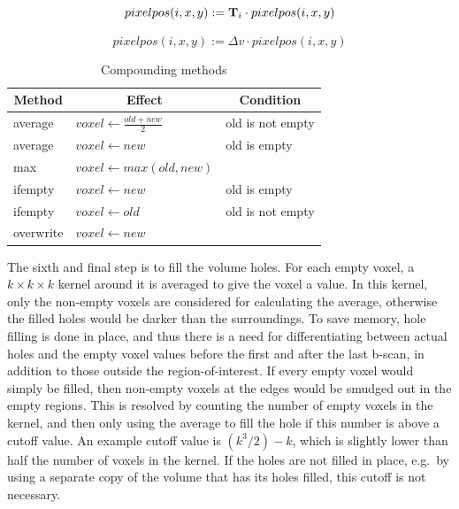	\begin{equation}
	\label{eq:transform_pixel_pos}
		pixelpos(i,x,y) := \textbf{T}_i \cdot pixelpos(i,x,y)
	\end{equation}
	
	\begin{equation}
	\label{eq:round_off}
		pixelpos(i,x,y) := \Delta v \cdot pixelpos(i,x,y)
	\end{equation}
	
	\begin{table}[h]
	\centering
	\begin{tabular}{| l l l |}
		\hline
		\multicolumn{1}{|c}{\textbf{Method}} & \multicolumn{1}{c}{\textbf{Effect}} & \multicolumn{1}{c|}{\textbf{Condition}} \\
		\hline
		\hline
		average 			& $voxel \leftarrow \frac{old+new}{2}$ 	& old is not empty \\
		average 			& $voxel \leftarrow new$ 				& old is empty \\
		max 				& $voxel \leftarrow max(old, new)$ 		& \\
		ifempty 			& $voxel \leftarrow new$ 				& old is empty \\
		ifempty 			& $voxel \leftarrow old$ 				& old is not empty \\
		overwrite 			& $voxel \leftarrow new$ 				& \\
		\hline
	\end{tabular}
	\caption{Compounding methods}
	\label{table:compounding_methods}
	\end{table}
	
	The sixth and final step is to fill the volume holes. For each empty voxel, a $k \times k \times k$ kernel around it is averaged to give the voxel a value. In this kernel, only the non-empty voxels are considered for calculating the average, otherwise the filled holes would be darker than the surroundings. To save memory, hole filling is done in place, and thus there is a need for differentiating between actual holes and the empty voxel values before the first and after the last b-scan, in addition to those outside the region-of-interest. If every empty voxel would simply be filled, then non-empty voxels at the edges would be smudged out in the empty regions. This is resolved by counting the number of empty voxels in the kernel, and then only using the average to fill the hole if this number is above a cutoff value. An example cutoff value is $(k^3/2)-k$, which is slightly lower than half the number of voxels in the kernel. If the holes are not filled in place, e.g.\ by using a separate copy of the volume that has its holes filled, this cutoff is not necessary.

